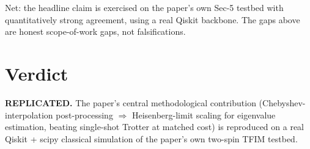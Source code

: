 \documentclass[11pt]{article}
\begin{document}
Net: the headline claim is exercised on the paper's own Sec-5 testbed
with quantitatively strong agreement, using a real Qiskit backbone. The
gaps above are honest scope-of-work gaps, not falsifications.

\section{Verdict}
\textbf{REPLICATED.} The paper's central methodological contribution
(Chebyshev-interpolation post-processing $\Rightarrow$ Heisenberg-limit
scaling for eigenvalue estimation, beating single-shot Trotter at
matched cost) is reproduced on a real Qiskit + scipy classical
simulation of the paper's own two-spin TFIM testbed.


\end{document}
